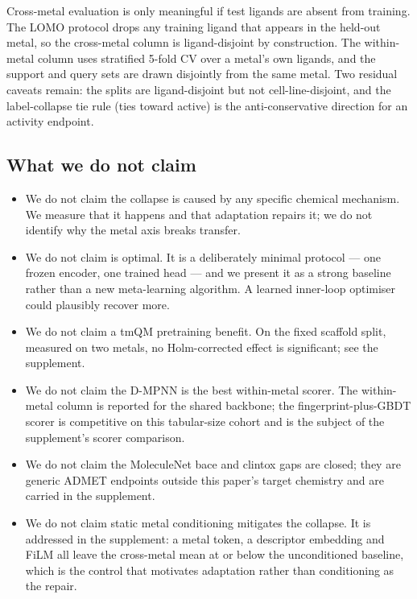 Cross-metal evaluation is only meaningful if test ligands are absent from
training. The LOMO protocol drops any training ligand that appears in the
held-out metal, so the cross-metal column is ligand-disjoint by construction.
The within-metal column uses stratified 5-fold CV over a metal's own ligands,
and the \fsma{} support and query sets are drawn disjointly from the same metal.
Two residual caveats remain: the splits are ligand-disjoint but not
cell-line-disjoint, and the label-collapse tie rule (ties toward active) is the
anti-conservative direction for an activity endpoint.

\subsection{What we do not claim}
\label{sec:lim:notclaim}

\begin{itemize}
\item We do not claim the collapse is caused by any specific chemical mechanism.
We measure that it happens and that adaptation repairs it; we do not identify
why the metal axis breaks transfer.
\item We do not claim \fsma{} is optimal. It is a deliberately minimal protocol
--- one frozen encoder, one trained head --- and we present it as a strong
baseline rather than a new meta-learning algorithm. A learned inner-loop
optimiser could plausibly recover more.
\item We do not claim a tmQM pretraining benefit. On the fixed scaffold split,
measured on two metals, no Holm-corrected effect is significant; see the
supplement.
\item We do not claim the D-MPNN is the best within-metal scorer. The within-metal
column is reported for the shared backbone; the fingerprint-plus-GBDT scorer is
competitive on this tabular-size cohort and is the subject of the supplement's
scorer comparison.
\item We do not claim the MoleculeNet bace and clintox gaps are closed; they are
generic ADMET endpoints outside this paper's target chemistry and are carried in
the supplement.
\item We do not claim static metal conditioning mitigates the collapse. It is
addressed in the supplement: a metal token, a descriptor embedding and FiLM all
leave the cross-metal mean at or below the unconditioned baseline, which is the
control that motivates adaptation rather than conditioning as the repair.
\end{itemize}


